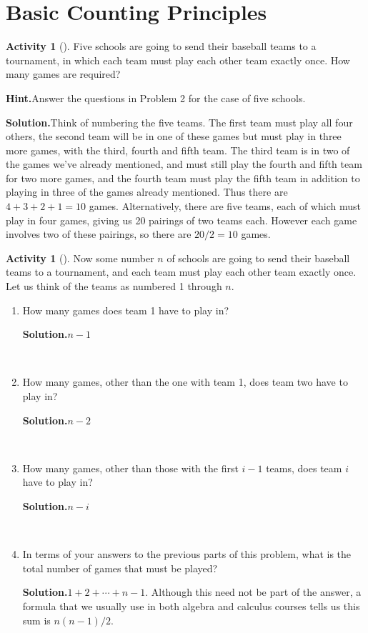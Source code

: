 \documentclass[10pt,]{book}
\theoremstyle{plain}
\theoremstyle{definition}
\newtheorem{activity}[project]{Activity}
\numberwithin{equation}{chapter}
\begin{document}
\section[{Basic Counting Principles}]{Basic Counting Principles}\label{section-2}
\begin{activity}[]\label{fiveteamtournament}
Five schools are going to send their baseball teams to a tournament, in which each team must play each other team exactly once. How many games are required?%
\par\medskip\noindent%
\textbf{Hint.}\quad Answer the questions in Problem 2 for the case of five schools.%
\par\medskip\noindent%
\textbf{Solution.}\quad Think of numbering the five teams. The first team must play all four others, the second team will be in one of these games but must play in three more games, with the third, fourth and fifth team. The third team is in two of the games we've already mentioned, and must still play the fourth and fifth team for two more games, and the fourth team must play the fifth team in addition to playing in three of the games already mentioned. Thus there are \(4+3+2+1 = 10\) games. Alternatively, there are five teams, each of which must play in four games, giving us 20 pairings of two teams each. However each game involves two of these pairings, so there are \(20/2 =10\) games.%
\end{activity}
\begin{activity}[]\label{baseball2}
Now some number \(n\) of schools are going to send their baseball teams to a tournament, and each team must play each other team exactly once. Let us think of the teams as numbered 1 through \(n\).%
~\par
\begin{enumerate}[label=(\alph*)]
 \item How many games does  team 1 have to play in?%
\par\medskip\noindent%
\textbf{Solution.}\quad \(n-1\)%

~\par
\item How many games, other than the one with team 1, does team two have to play in?%
\par\medskip\noindent%
\textbf{Solution.}\quad \(n-2\)%

~\par
\item How many games, other than those with the first \(i-1\) teams, does team \(i\) have to play in?%
\par\medskip\noindent%
\textbf{Solution.}\quad \(n-i\)%

~\par
\item In terms of your answers to the previous parts of this problem, what is the total number of games that must be played?%
\par\medskip\noindent%
\textbf{Solution.}\quad \(1+2 +\cdots+ n-1\). Although this need not be part of the answer, a formula that we usually use in both algebra and calculus courses tells us this sum is \(n(n-1)/2\).%

\end{enumerate}
\end{activity}
\end{document}
